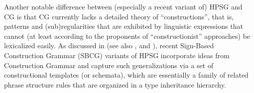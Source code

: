 \documentclass[output=paper
                ,modfonts
                ,nonflat
	        ,collection
	        ,collectionchapter
	        ,collectiontoclongg
 	        ,biblatex
                ,babelshorthands
                ,newtxmath
                ,draftmode
                ,colorlinks, citecolor=brown
]{./langsci/langscibook}
\begin{document}


Another notable difference between (especially a recent variant of)
HPSG and CG is that CG currently lacks a detailed theory of
``constructions'', 
that is, patterns and (sub)regularities that are
exhibited by linguistic expressions that cannot (at least according to
the proponents of ``constructionist'' approaches) be lexicalized easily.
As discussed in  (see also
\citealt{Sag97a}, \citealt{Fillmore99a} and \citealt{GSag2000a-u}),  recent Sign-Based Construction
Grammar (SBCG) variants of HPSG \citep{SBK2012a} 
incorporate ideas from Construction Grammar 
\citep{FKoC88a} and capture such
generalizations via a set of constructional templates (or schemata),
which are essentially a family of related phrase structure rules that
are organized in a type inheritance hierarchy.
\end{document}
